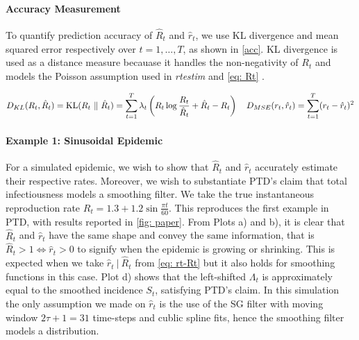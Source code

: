\documentclass[12pt]{article}
\begin{document}
    \paragraph{Accuracy Measurement} To quantify prediction accuracy of $\hat{R}_t$ and $\hat{r}_t$, we use KL divergence and mean squared error respectively over $t = 1,\dots,T$, as shown in \cref{acc}.
    KL divergence is used as a distance measure becauase it handles the non-negativity of $R_t$ and models the Poisson assumption 
    used in \textit{rtestim} and \cref{eq: Rt} \citep{Liu2024}.

    \begin{equation} \label{acc}
      D_{KL}(R_t, \hat{R}_t) = \operatorname{KL}(R_t \ \Vert\ \hat{R}_t) = \sum_{t = 1}^T \lambda_t \left( R_t \log{\frac{R_t}{\hat{R}_t}} + \hat{R}_t - R_t \right) \quad 
      D_{MSE}(r_t, \hat{r}_t) = \sum_{t = 1}^T (r_t - \hat{r}_t)^2
    \end{equation}

    \paragraph{Example 1: Sinusoidal Epidemic} For a simulated epidemic, we wish to show that $\hat{R}_t$ and $\hat{r}_t$ accurately estimate their respective rates. 
    Moreover, we wish to substantiate PTD's claim that total infectiousness models a smoothing filter.
    We take the true instantaneous reproduction rate $R_t = 1.3 + 1.2\sin{\frac{\pi t}{60}}$. 
    This reproduces the first example in PTD, with results reported in \cref{fig: paper}. From Plots a) and b), it is clear that $\hat{R}_t$ and $\hat{r}_t$ have the same shape 
    and convey the same information, that is $\hat{R}_t > 1 \iff \hat{r}_t > 0$ to signify when the epidemic is growing or shrinking. 
    This is expected when we take $\hat{r}_t \ |\ \hat{R}_t$ from \cref{eq: rt-Rt}
    but it also holds for smoothing functions in this case. Plot d) shows that the left-shifted $\Lambda_t$ is approximately equal to the smoothed incidence $S_t$, 
    satisfying PTD's claim. In this simulation the only assumption we made on $\hat{r}_t$ is the use of the SG filter with moving window 
    $2\tau + 1 = 31$ time-steps and cublic spline fits, hence the smoothing filter models a distribution.
\end{document}
